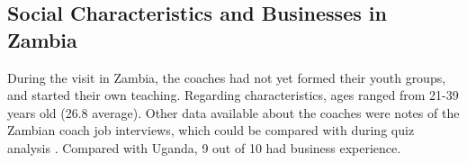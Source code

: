 \subsection{Social Characteristics and Businesses in Zambia}
During the visit in Zambia, the coaches had not yet formed their youth groups, and started their own teaching. Regarding characteristics, ages ranged from 21-39 years old (26.8 average). Other data available about the coaches were notes of the Zambian coach job interviews, which could be compared with during quiz analysis \citep{yd-zambia-interviews}. Compared with Uganda, 9 out of 10 had business experience.





%

